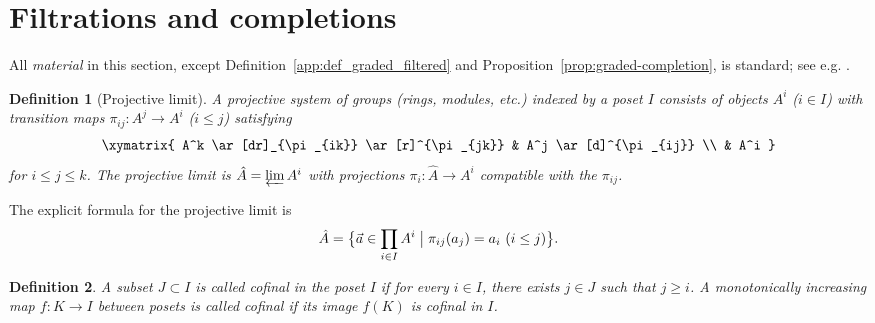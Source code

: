 \documentclass[a4paper,12pt]{amsart}
\newtheorem{deff}{Definition}
\newcommand{\beqn}{\begin{eqnarray}\nonumber}
\newcommand{\eeq}{\end{eqnarray}}
\newcommand{\N}{{\mathbb N}}
\begin{document}




\appendix


\section{Filtrations and completions %
}\label{sec:app}

\setcounter{equation}{0}
\renewcommand{\theequation}{\thesection.\arabic{equation}}

\noindent \noindent All \emph{material} in this section, except Definition~\ref{app:def_graded_filtered} and Proposition~\ref{prop:graded-completion}, 
is standard; see e.g. \cite{may-filtrations, stacks-project}.

\begin{deff}[Projective limit]\label{app:deff_projlim}
A \emph{projective system} of groups (rings, modules, etc.) indexed by a poset $I$ consists of 
objects $A^i$ ($i\in I$) with transition maps $\pi_{ij}\colon A^j\to A^i$ ($i\le j$) satisfying
\begin{equation}\label{app:eq_inverse_compatibility}
   \xymatrix{
A^k \ar[dr]_{\pi_{ik}} \ar[r]^{\pi_{jk}} & A^j \ar[d]^{\pi_{ij}} \\
& A^i
} 
\end{equation}
for $i\le j\le k$. The \emph{projective limit} is $\hat{A} = \varprojlim A^i$ with projections 
$\pi_i\colon\hat{A}\to A^i$ compatible with the $\pi_{ij}$.
\end{deff}

\noindent The explicit formula for the projective limit is
\begin{equation}\label{app:eq_proj_limit}
  \hat{A} = \bigl\{ \vec{a}\in\prod_{i\in I} A^i \bigm| \pi_{ij}(a_j)=a_i \ (i\le j) \bigr\}. 
\end{equation}

\begin{deff}\label{def:cofinal}\normalfont
A subset $J \subset I$ is called \emph{cofinal} in the poset $I$ if for every $i \in I$, there exists $j \in J$ such that $j \geq i$.
A monotonically increasing map $f \colon K \to I$ between posets is called \emph{cofinal} if its image $f(K)$ is cofinal in $I$.
\end{deff}
\end{document}
